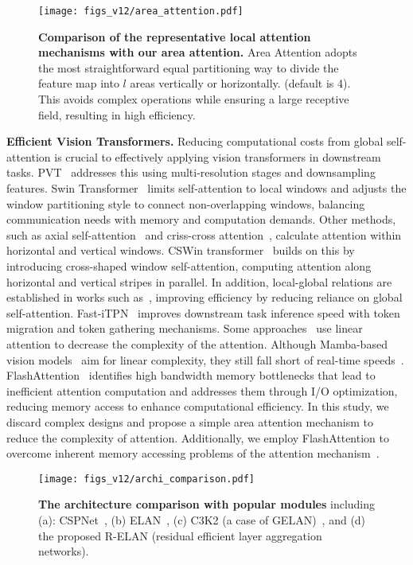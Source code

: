 \begin{figure*}[t]
\centering
\texttt{[image: figs\_v12/area\_attention.pdf]}
\caption{\textbf{Comparison of the representative local attention mechanisms with our area attention.}  Area Attention adopts the most straightforward equal partitioning way to divide the feature map into $l$ areas vertically or horizontally. (default is 4). This avoids complex operations while ensuring a large receptive field, resulting in high efficiency.}
\label{fig:split}
\end{figure*}



\noindent\textbf{Efficient Vision Transformers.} 
Reducing computational costs from global self-attention is crucial to effectively applying vision transformers in downstream tasks. PVT~\cite{pvt} addresses this using multi-resolution stages and downsampling features. 
%
Swin Transformer~\cite{liu2021swin} limits self-attention to local windows and adjusts the window partitioning style to connect non-overlapping windows, balancing communication needs with memory and computation demands.
%
Other methods, such as axial self-attention~\cite{ho2019axial} and criss-cross attention~\cite{huang2019ccnet}, calculate attention within horizontal and vertical windows. CSWin transformer~\cite{dong2022cswin} builds on this by introducing cross-shaped window self-attention, computing attention along horizontal and vertical stripes in parallel.
%
In addition, local-global relations are established in works such as~\cite{chu2021twins, yu2021glance}, improving efficiency by reducing reliance on global self-attention.
%
Fast-iTPN~\cite{tian2024fast} improves downstream task inference speed with token migration and token gathering mechanisms.
%
Some approaches~\cite{shen2021linear_attn, wang2020linformer_attn, katharopoulos2020transformers_attn, xie2025sana} use linear attention to decrease the complexity of the attention. Although Mamba-based vision models~\cite{zhu2024vision_mamba, liu2024vmamba} aim for linear complexity, they still fall short of real-time speeds~\cite{liu2024vmamba}.
%
FlashAttention~\cite{dao2022flashattention, dao2023flashattentionv2} identifies high bandwidth memory bottlenecks that lead to inefficient attention computation and addresses them through I/O optimization, reducing memory access to enhance computational efficiency.
%
In this study, we discard complex designs and propose a simple area attention mechanism to reduce the complexity of attention. Additionally, we employ FlashAttention to overcome inherent memory accessing problems of the attention mechanism~\cite{dao2022flashattention, dao2023flashattentionv2}.



\begin{figure*}[!htb]
\centering
\texttt{[image: figs\_v12/archi\_comparison.pdf]}
\caption{\textbf{The architecture comparison with popular modules} including (a): CSPNet~\cite{wang2020cspnet}, (b) ELAN~\cite{wang2022designing_elan}, (c) C3K2 (a case of GELAN)~\cite{wang2024yolov9, jocher2024yolov11}, and (d) the proposed R-ELAN (residual efficient layer aggregation networks). }
\label{fig:archi_comparison}
\end{figure*}